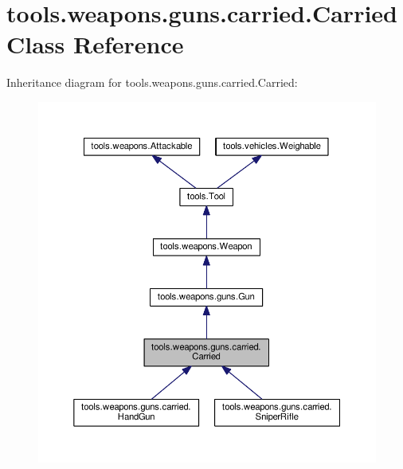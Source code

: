 \hypertarget{classtools_1_1weapons_1_1guns_1_1carried_1_1_carried}{}\section{tools.\+weapons.\+guns.\+carried.\+Carried Class Reference}
\label{classtools_1_1weapons_1_1guns_1_1carried_1_1_carried}


Inheritance diagram for tools.\+weapons.\+guns.\+carried.\+Carried\+:
\nopagebreak
\begin{figure}[H]
\begin{center}
\leavevmode
\includegraphics[width=350pt]{classtools_1_1weapons_1_1guns_1_1carried_1_1_carried__inherit__graph}
\end{center}
\end{figure}


